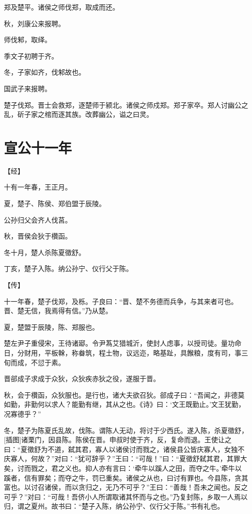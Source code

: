 \documentclass[a4paper,12pt,UTF8,twoside]{ctexbook}
\begin{document}
郑及楚平。诸侯之师伐郑，取成而还。

秋，刘康公来报聘。

师伐邾，取绎。

季文子初聘于齐。

冬，子家如齐，伐邾故也。

国武子来报聘。

楚子伐郑。晋士会救郑，逐楚师于颍北。诸侯之师戍郑。郑子家卒。郑人讨幽公之乱，斫子家之棺而逐其族。改葬幽公，谥之曰灵。

\section{宣公十一年}


【经】

十有一年春，王正月。

夏，楚子、陈侯、郑伯盟于辰陵。

公孙归父会齐人伐莒。

秋，晋侯会狄于欑函。

冬十月，楚人杀陈夏徵舒。

丁亥，楚子入陈。纳公孙宁、仪行父于陈。

【传】

十一年春，楚子伐郑，及栎。子良曰：“晋、楚不务德而兵争，与其来者可也。晋、楚无信，我焉得有信。”乃从楚。

夏，楚盟于辰陵，陈、郑服也。

楚左尹子重侵宋，王待诸郔。令尹蒍艾猎城沂，使封人虑事，以授司徒。量功命日，分财用，平板榦，称畚筑，程土物，议远迩，略基趾，具餱粮，度有司，事三旬而成，不愆于素。

晋郤成子求成于众狄，众狄疾赤狄之役，遂服于晋。

秋，会于欑函，众狄服也。是行也，诸大夫欲召狄。郤成子曰：“吾闻之，非德莫如勤，非勤何以求人？能勤有继，其从之也。《诗》曰：‘文王既勤止。’文王犹勤，况寡德乎？”

冬，楚子为陈夏氏乱故，伐陈。谓陈人无动，将讨于少西氏。遂入陈，杀夏徵舒，[插图]诸栗门，因县陈。陈侯在晋。申叔时使于齐，反，复命而退。王使让之曰：“夏徵舒为不道，弑其君，寡人以诸侯讨而戮之，诸侯县公皆庆寡人，女独不庆寡人，何故？”对曰：“犹可辞乎？”王曰：“可哉！”曰：“夏徵舒弑其君，其罪大矣，讨而戮之，君之义也。抑人亦有言曰：‘牵牛以蹊人之田，而夺之牛。’牵牛以蹊者，信有罪矣；而夺之牛，罚已重矣。诸侯之从也，曰讨有罪也。今县陈，贪其富也。以讨召诸侯，而以贪归之，无乃不可乎？”王曰：“善哉！吾未之闻也。反之可乎？”对曰：“可哉！吾侪小人所谓取诸其怀而与之也。”乃复封陈，乡取一人焉以归，谓之夏州。故书曰：“楚子入陈，纳公孙宁、仪行父于陈。”书有礼也。
\end{document}
